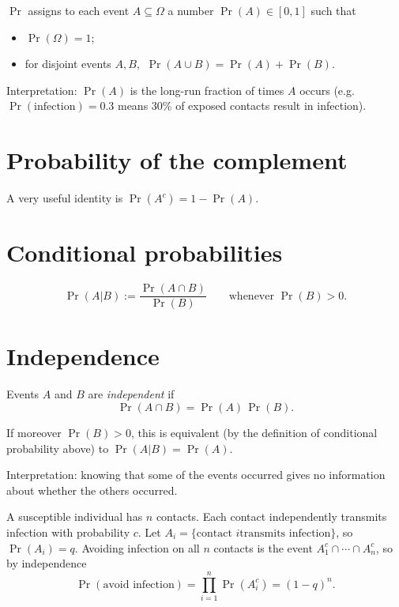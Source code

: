 \begin{definition}
$\Pr$ assigns to each event $A\subseteq\Omega$ a number $\Pr(A)\in[0,1]$ such that
\begin{itemize}[nosep]
  \item $\Pr(\Omega)=1$;
  \item for disjoint events $A,B$, $\ \Pr(A\cup B)=\Pr(A)+\Pr(B)$.
\end{itemize}
\end{definition}

Interpretation: $\Pr(A)$ is the long-run fraction of times $A$ occurs (e.g. $\Pr(\text{infection})=0.3$ means 30\% of exposed contacts result in infection).

\section{Probability of the complement}
A very useful identity is $\Pr(A^c) = 1-\Pr(A)$.


\section{Conditional probabilities}
\[
\Pr(A|B) := \frac{\Pr(A \cap B)}{\Pr(B)} \qquad \text{whenever $\Pr(B) > 0$.}
\]
\section{Independence}

\begin{definition}
Events $A$ and $B$ are \emph{independent} if
\[
\Pr(A \cap B) = \Pr(A)\,\Pr(B).
\]
\end{definition}

If moreover $\Pr(B)>0$, this is equivalent (by the definition of
conditional probability above) to $\Pr(A|B) = \Pr(A)$.

Interpretation: knowing that some of the events occurred gives no
information about whether the others occurred.

\begin{example}\label{example:no infection}
A susceptible individual has $n$ contacts. Each contact independently
transmits infection with probability $c$. Let $A_i=\{\text{contact $i$
  transmits infection}\}$, so $\Pr(A_i)=q$. Avoiding infection on
all $n$ contacts is the event $A_1^c\cap\cdots\cap A_n^c$, so by
independence
\[
\Pr(\text{avoid infection}) = \prod_{i=1}^n \Pr(A_i^c) = (1-q)^n.
\]
\end{example}

